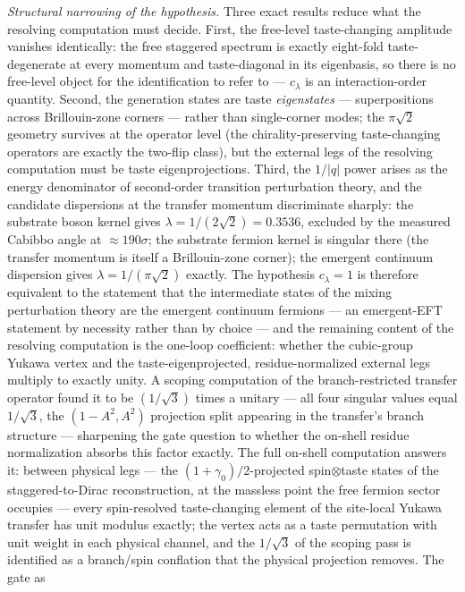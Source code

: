 \documentclass[
]{article}
\begin{document}
\emph{Structural narrowing of the hypothesis.} Three exact results
reduce what the resolving computation must decide. First, the free-level
taste-changing amplitude vanishes identically: the free staggered
spectrum is exactly eight-fold taste-degenerate at every momentum and
taste-diagonal in its eigenbasis, so there is no free-level object for
the identification to refer to --- \(c_\lambda\) is an interaction-order
quantity. Second, the generation states are taste \emph{eigenstates} ---
superpositions across Brillouin-zone corners --- rather than
single-corner modes; the \(\pi\sqrt{2}\) geometry survives at the
operator level (the chirality-preserving taste-changing operators are
exactly the two-flip class), but the external legs of the resolving
computation must be taste eigenprojections. Third, the \(1/|q|\) power
arises as the energy denominator of second-order transition perturbation
theory, and the candidate dispersions at the transfer momentum
discriminate sharply: the substrate boson kernel gives
\(\lambda = 1/(2\sqrt{2}) = 0.3536\), excluded by the measured Cabibbo
angle at \(\approx 190\sigma\); the substrate fermion kernel is singular
there (the transfer momentum is itself a Brillouin-zone corner); the
emergent continuum dispersion gives \(\lambda = 1/(\pi\sqrt{2})\)
exactly. The hypothesis \(c_\lambda = 1\) is therefore equivalent to the
statement that the intermediate states of the mixing perturbation theory
are the emergent continuum fermions --- an emergent-EFT statement by
necessity rather than by choice --- and the remaining content of the
resolving computation is the one-loop coefficient: whether the
cubic-group Yukawa vertex and the taste-eigenprojected,
residue-normalized external legs multiply to exactly unity. A scoping
computation of the branch-restricted transfer operator found it to be
\((1/\sqrt{3})\) times a unitary --- all four singular values equal
\(1/\sqrt{3}\), the \((1 - A^2, A^2)\) projection split appearing in the
transfer's branch structure --- sharpening the gate question to whether
the on-shell residue normalization absorbs this factor exactly. The full
on-shell computation answers it: between physical legs --- the
\((1+\gamma_0)/2\)-projected spin\(\otimes\)taste states of the
staggered-to-Dirac reconstruction, at the massless point the free
fermion sector occupies --- every spin-resolved taste-changing element
of the site-local Yukawa transfer has unit modulus exactly; the vertex
acts as a taste permutation with unit weight in each physical channel,
and the \(1/\sqrt{3}\) of the scoping pass is identified as a
branch/spin conflation that the physical projection removes. The gate as
\end{document}
